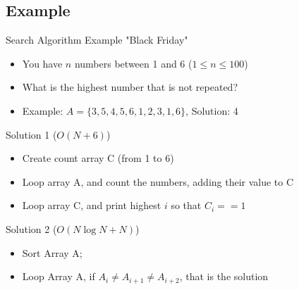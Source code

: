 \subsection{Example}
\begin{frame}{Search Algorithm Example "Black Friday"}

  \begin{block}{}
    \begin{itemize}
      \item You have $n$ numbers between 1 and 6 ($1 \leq n \leq 100$)
      \item What is the highest number that is not repeated?
      \item Example: $A = \{3, 5, 4, 5, 6, 1, 2, 3, 1, 6\}$, Solution: 4
    \end{itemize}
  \end{block}

  \begin{exampleblock}{Solution 1 ($O(N+6)$)}
    \begin{itemize}
      \item Create count array C (from 1 to 6)
      \item Loop array A, and count the numbers, adding their value to C
      \item Loop array C, and print highest $i$ so that $C_i == 1$
    \end{itemize}
  \end{exampleblock}

  \begin{exampleblock}{Solution 2 ($O(N\log N + N)$)}
    \begin{itemize}
      \item Sort Array A;
      \item Loop Array A, if $A_i \neq A_{i+1} \neq A_{i+2}$, that is the solution
    \end{itemize}
  \end{exampleblock}
\end{frame}


